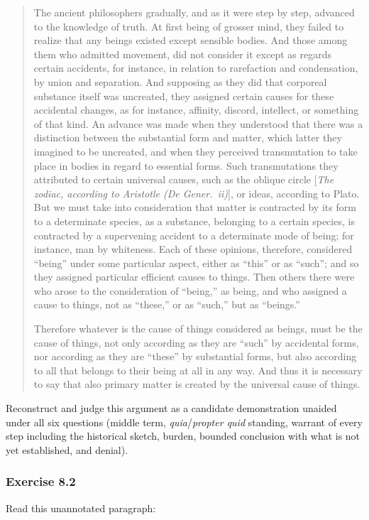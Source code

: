 \begin{quote}
The ancient philosophers gradually, and as it were step by step, advanced to the knowledge of truth. At first being of grosser mind, they failed to realize that any beings existed except sensible bodies. And those among them who admitted movement, did not consider it except as regards certain accidents, for instance, in relation to rarefaction and condensation, by union and separation. And supposing as they did that corporeal substance itself was uncreated, they assigned certain causes for these accidental changes, as for instance, affinity, discord, intellect, or something of that kind. An advance was made when they understood that there was a distinction between the substantial form and matter, which latter they imagined to be uncreated, and when they perceived transmutation to take place in bodies in regard to essential forms. Such transmutations they attributed to certain universal causes, such as the oblique circle [\emph{The zodiac, according to Aristotle (De Gener.\ ii)}], or ideas, according to Plato. But we must take into consideration that matter is contracted by its form to a determinate species, as a substance, belonging to a certain species, is contracted by a supervening accident to a determinate mode of being; for instance, man by whiteness. Each of these opinions, therefore, considered ``being'' under some particular aspect, either as ``this'' or as ``such''; and so they assigned particular efficient causes to things. Then others there were who arose to the consideration of ``being,'' as being, and who assigned a cause to things, not as ``these,'' or as ``such,'' but as ``beings.''

Therefore whatever is the cause of things considered as beings, must be the cause of things, not only according as they are ``such'' by accidental forms, nor according as they are ``these'' by substantial forms, but also according to all that belongs to their being at all in any way. And thus it is necessary to say that also primary matter is created by the universal cause of things.
\end{quote}

Reconstruct and judge this argument as a candidate demonstration unaided under all six questions (middle term, \emph{quia}/\emph{propter quid} standing, warrant of every step including the historical sketch, burden, bounded conclusion with what is not yet established, and denial).

\subsubsection*{Exercise 8.2}
Read this unannotated paragraph:

